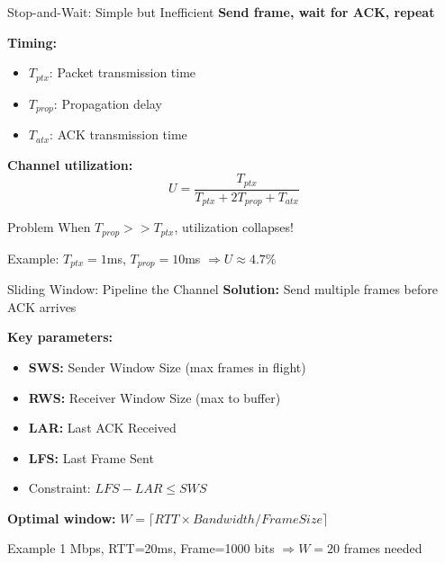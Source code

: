 \documentclass[aspectratio=169,11pt]{beamer}
\begin{document}
\begin{frame}{Stop-and-Wait: Simple but Inefficient}
    \textbf{Send frame, wait for ACK, repeat}
    
    \vspace{0.3cm}
    \textbf{Timing:}
    \begin{itemize}
        \item $T_{ptx}$: Packet transmission time
        \item $T_{prop}$: Propagation delay
        \item $T_{atx}$: ACK transmission time
    \end{itemize}
    
    \textbf{Channel utilization:}
    \[
    U = \frac{T_{ptx}}{T_{ptx} + 2T_{prop} + T_{atx}}
    \]
    
    \begin{alertblock}{Problem}
        When $T_{prop} >> T_{ptx}$, utilization collapses!
        
        Example: $T_{ptx}=1$ms, $T_{prop}=10$ms $\Rightarrow U \approx 4.7\%$
    \end{alertblock}
\end{frame}

\begin{frame}{Sliding Window: Pipeline the Channel}
    \textbf{Solution:} Send multiple frames before ACK arrives
    
    \vspace{0.3cm}
    \textbf{Key parameters:}
    \begin{itemize}
        \item \textbf{SWS:} Sender Window Size (max frames in flight)
        \item \textbf{RWS:} Receiver Window Size (max to buffer)
        \item \textbf{LAR:} Last ACK Received
        \item \textbf{LFS:} Last Frame Sent
        \item Constraint: $LFS - LAR \leq SWS$
    \end{itemize}
    
    \vspace{0.2cm}
    \textbf{Optimal window:} $W = \lceil RTT \times Bandwidth / FrameSize \rceil$
    
    \begin{exampleblock}{Example}
        1 Mbps, RTT=20ms, Frame=1000 bits $\Rightarrow W = 20$ frames needed
    \end{exampleblock}
\end{frame}
\end{document}
